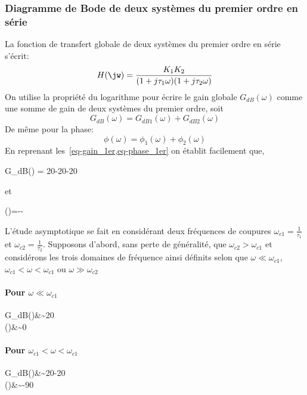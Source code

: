 \subsubsection{Diagramme de Bode de deux systèmes du premier ordre en série }
La fonction de transfert globale de deux systèmes du premier ordre en série s'écrit:
\begin{align}
    H(\jw)=\dfrac{K_1K_2}{(1+j\tau_1\omega)(1+j\tau_2\omega)}\label{eq-1er_serie}
\end{align}
On utilise la propriété du logarithme pour écrire le gain globale $G_{dB}(\omega)$ comme une somme de 
gain de deux systèmes du premier ordre, soit
$$
G_{dB}(\omega) = G_{dB1}(\omega) + G_{dB2}(\omega)
$$
De même pour la phase:
$$
\phi(\omega)= \phi_1(\omega) + \phi_2(\omega)
$$
En reprenant les~\cref{eq-gain_1er,eq-phase_1er} on établit facilement que,
\begin{bequation}
    G_{dB}(\omega) = 20-20-20
\end{bequation}
et
\begin{bequation}
\phi(\omega)=-\arctan{\tau_1\omega}-\arctan{\tau_2\omega}
\end{bequation}

L'étude asymptotique se fait en considérant deux fréquences de coupures 
$\omega_{c1}=\frac{1}{\tau_1}$ et $\omega_{c2}=\frac{1}{\tau_2}$.
Supposons d'abord, sans perte de généralité, que $\omega_{c2}>\omega_{c1}$ et considérons 
les trois domaines de fréquence ainsi définits selon que $\omega\ll\omega_{c1}$, $\omega_{c1}<\omega<\omega_{c1}$ ou 
$\omega\gg\omega_{c2}$

\paragraph{Pour $\omega\ll\omega_{c1}$}
\begin{bequation}
G_{dB}(\omega)&\sim20\\
\phi(\omega)&\sim0\degree
\end{bequation}

\paragraph{Pour $\omega_{c1}<\omega<\omega_{c1}$}
\begin{bequation}
    G_{dB}(\omega)&\sim20-20\\
    \phi(\omega)&\sim-90\degree
\end{bequation}

